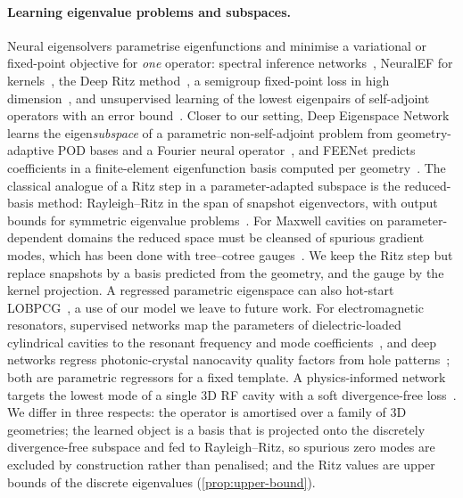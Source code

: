 \paragraph{Learning eigenvalue problems and subspaces.}
Neural eigensolvers parametrise eigenfunctions and minimise a variational or fixed-point objective for \emph{one} operator: spectral inference networks~\citep{pfau2019spectral}, NeuralEF for kernels~\citep{deng2022neuralef}, the Deep Ritz method~\citep{e2018deep}, a semigroup fixed-point loss in high dimension~\citep{han2020solving}, and unsupervised learning of the lowest eigenpairs of self-adjoint operators with an error bound~\citep{benshaul2023deep}.
Closer to our setting, Deep Eigenspace Network learns the eigen\emph{subspace} of a parametric non-self-adjoint problem from geometry-adaptive POD bases and a Fourier neural operator~\citep{li2026deep}, and FEENet predicts coefficients in a finite-element eigenfunction basis computed per geometry~\citep{li2026finite}.
The classical analogue of a Ritz step in a parameter-adapted subspace is the reduced-basis method: Rayleigh--Ritz in the span of snapshot eigenvectors, with output bounds for symmetric eigenvalue problems~\citep{machiels2000output}.
For Maxwell cavities on parameter-dependent domains the reduced space must be cleansed of spurious gradient modes, which has been done with tree--cotree gauges~\citep{kappesser2023reduced,ziegler2024mixed}.
We keep the Ritz step but replace snapshots by a basis predicted from the geometry, and the gauge by the kernel projection.
A regressed parametric eigenspace can also hot-start LOBPCG~\citep{fanaskov2025deep,knyazev2001toward}, a use of our model we leave to future work.
For electromagnetic resonators, supervised networks map the parameters of dielectric-loaded cylindrical cavities to the resonant frequency and mode coefficients~\citep{lewis2022machine}, and deep networks regress photonic-crystal nanocavity quality factors from hole patterns~\citep{asano2019iterative}; both are parametric regressors for a fixed template.
A physics-informed network targets the lowest mode of a single 3D RF cavity with a soft divergence-free loss~\citep{shali2024dfsnet}.
We differ in three respects: the operator is amortised over a family of 3D geometries; the learned object is a basis that is projected onto the discretely divergence-free subspace and fed to Rayleigh--Ritz, so spurious zero modes are excluded by construction rather than penalised; and the Ritz values are upper bounds of the discrete eigenvalues (\cref{prop:upper-bound}).

